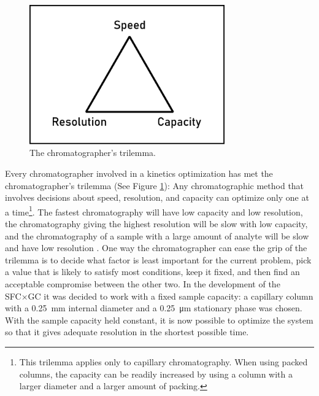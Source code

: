 \begin{figure}
\centering
\includegraphics[width=0.75\textwidth]{Figures/Triangle.pdf}
\decoRule
\caption[Schematic diagram of a the chromatographer's trilemma.]{The chromatographer's trilemma.}
\label{fig:trilemma}
\end{figure}


Every chromatographer involved in a kinetics optimization has met the
chromatographer's trilemma (See Figure \ref{fig:trilemma}): Any chromatographic
method that involves decisions about speed, resolution, and capacity can
optimize only one at a time\footnote{This trilemma applies only to capillary
chromatography. When using packed columns, the capacity can be readily increased
by using a column with a larger diameter and a larger amount of packing.}. The
fastest chromatography will have low capacity and low resolution, the
chromatography giving the highest resolution will be slow with low capacity, and
the chromatography of a sample with a large amount of analyte will be slow and
have low resolution \autocite{Klee2002}. One way the chromatographer can ease
the grip of the trilemma is to decide what factor is least important for the
current problem, pick a value that is likely to satisfy most conditions, keep it
fixed, and then find an acceptable compromise between the other two. In the
development of the SFC×GC it was decided to work with a fixed sample capacity: a
capillary column with a \SI{0.25}{\milli\metre} internal diameter and a
\SI{0.25}{\micro\metre} stationary phase was chosen. With the sample capacity
held constant, it is now possible to optimize the system so that it gives
adequate resolution in the shortest possible time.


